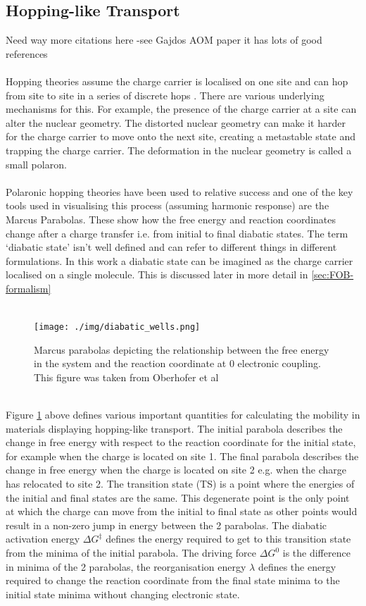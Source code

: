\subsection{Hopping-like Transport}
{\Large Need way more citations here -see Gajdos AOM paper it has lots of good references}
\\\\
Hopping theories assume the charge carrier is localised on one site and can hop from site to site in a series of discrete hops \cite{oberhofer_charge_2017}. There are various underlying mechanisms for this. For example, the presence of the charge carrier at a site can alter the nuclear geometry. The distorted nuclear geometry can make it harder for the charge carrier to move onto the next site, creating a metastable state and trapping the charge carrier. The deformation in the nuclear geometry is called a small polaron.
\\\\
Polaronic hopping theories have been used to relative success and one of the key tools used in visualising this process (assuming harmonic response) are the Marcus Parabolas. These show how the free energy and reaction coordinates change after a charge transfer i.e. from initial to final diabatic states. The term `diabatic state' isn't well defined and can refer to different things in different formulations. In this work a diabatic state can be imagined as the charge carrier localised on a single molecule. This is discussed later in more detail in  \ref{sec:FOB-formalism}\\
\\
\begin{figure}[ht]
  \texttt{[image: ./img/diabatic\_wells.png]}
  \caption{Marcus parabolas depicting the relationship between the free energy in the system and the reaction coordinate at 0 electronic coupling. This figure was taken from Oberhofer et al \cite{oberhofer_charge_2017}}
  \label{fig:diab_wells}
\end{figure}
\\
Figure \ref{fig:diab_wells} above defines various important quantities for calculating the mobility in materials displaying hopping-like transport. The initial parabola describes the change in free energy with respect to the reaction coordinate for the initial state, for example when the charge is located on site 1. The final parabola describes the change in free energy when the charge is located on site 2 e.g. when the charge has relocated to site 2. The transition state (TS) is a point where the energies of the initial and final states are the same. This degenerate point is the only point at which the charge can move from the initial to final state as other points would result in a non-zero jump in energy between the 2 parabolas. The diabatic activation energy $\Delta G^{\ddagger}$ defines the energy required to get to this transition state from the minima of the initial parabola. The driving force $\Delta G^{0}$ is the difference in minima of the 2 parabolas, the reorganisation energy $\lambda$ defines the energy required to change the reaction coordinate from the final state minima to the initial state minima without changing electronic state.

